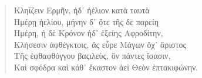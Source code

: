 %
%
%
\begin{verse}
\textgreek{Κληΐζειν Ερμῆν, ἠδ᾿ ἠέλιον κατὰ ταυτὰ}\\
\textgreek{Ημέρῃ ἠελίου, μήνην δ᾿ ὅτε τῆς δε παρείη}\\
\textgreek{Ημέρη, ἠ δὲ Κρόνον ἠδ᾿ ἑξείης Αφροδίτην},\\
%
\textgreek{Κλήσεσιν ἀφθέγκτοις, ἃς εὗρε Μάγων ὄχ᾽ ἄριστος}\\
%
%
%
\textgreek{Τῆς ἑφθαφθόγγου βαςιλεὺς, ὃν πάντες ἴσασιν,}\\
%
\textgreek{Καὶ σφόδρα καὶ κάθ᾿ ἕκαστον ἀεὶ Θεὸν ἑπτακιφώνην.}
\end{verse}
